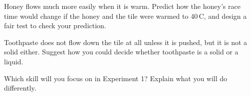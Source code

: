 \begin{yr8box}
\begin{keepext}
\exttask Honey flows much more easily when it is warm. Predict how the honey's race time would change if the honey and the tile were warmed to 40\,\textdegree C, and design a fair test to check your prediction.
\answerbox{5cm}
\end{keepext}
\begin{keepext}
\exttask Toothpaste does not flow down the tile at all unless it is pushed, but it is not a solid either. Suggest how you could decide whether toothpaste is a solid or a liquid.
\answerbox{5cm}
\end{keepext}
\end{yr8box}


\begin{skillcheck}
\end{skillcheck}

\task Which skill will you focus on in Experiment 1? Explain what you will do differently.
\answerbox{5cm}

\setcounter{section}{0}\renewcommand{\symid}{\thesection}
\renewcommand{\expword}{Experiment}\renewcommand{\expcaps}{EXPERIMENT}
